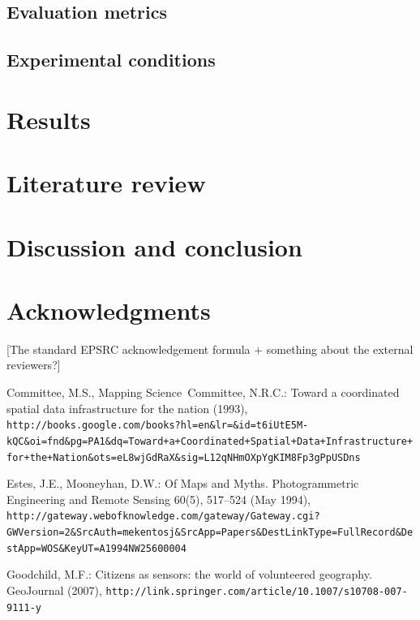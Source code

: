 \documentclass{llncs}
\begin{document}
{\subsection{Evaluation metrics}
\subsection{Experimental conditions}

\section{Results}

\section{Literature review}

\section{Discussion and conclusion}

\section*{Acknowledgments}

{[}The standard EPSRC acknowledgement formula + something about the external reviewers?{]}







\begin{thebibliography}{1}
\providecommand{\url}[1]{\texttt{#1}}
\providecommand{\urlprefix}{URL }

Committee, M.S., Mapping Science~Committee, N.R.C.: {Toward a coordinated
  spatial data infrastructure for the nation} (1993),
  \url{http://books.google.com/books?hl=en&lr=&id=t6iUtE5M-kQC&oi=fnd&pg=PA1&dq=Toward+a+Coordinated+Spatial+Data+Infrastructure+for+the+Nation&ots=eL8wjGdRaX&sig=L12qNHmOXpYgKIM8Fp3gPpUSDns}

Estes, J.E., Mooneyhan, D.W.: {Of Maps and Myths}. Photogrammetric Engineering
  and Remote Sensing  60(5),  517--524 (May 1994),
  \url{http://gateway.webofknowledge.com/gateway/Gateway.cgi?GWVersion=2&SrcAuth=mekentosj&SrcApp=Papers&DestLinkType=FullRecord&DestApp=WOS&KeyUT=A1994NW25600004}

Goodchild, M.F.: {Citizens as sensors: the world of volunteered geography}.
  GeoJournal  (2007),
  \url{http://link.springer.com/article/10.1007/s10708-007-9111-y}


\end{thebibliography}}
\end{document}
